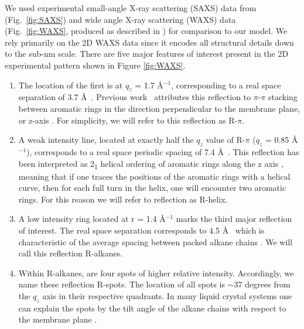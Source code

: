 \documentclass{article}
\newcommand{\angstrom}{\textup{\AA}}
\begin{document}
 
  We used experimental small-angle X-ray scattering (SAXS) data from
  \cite{feng_thin_2016} (Fig.~\ref{fig:SAXS}) and wide angle X-ray scattering
  (WAXS) data (Fig.~\ref{fig:WAXS}, produced as described in
  \cite{feng_scalable_2014}) for comparison to our model. We rely primarily on the 2D WAXS data
  since it encodes all structural details down to the sub-nm scale.  There are
  five major features of interest present in the 2D experimental pattern shown in
  Figure \ref{fig:WAXS}.

  \begin{enumerate} 
  
	\item The location of the first is at $q_z$ = 1.7 \angstrom$^{-1}$,
	corresponding to a real space separation of 3.7 \angstrom~. Previous
	work~\cite{feng_scalable_2014} attributes this reflection to $\pi$-$\pi$
	stacking between aromatic rings in the direction perpendicular to the membrane
	plane, or z-axis \cite{feng_scalable_2014}. For simplicity, we will refer to
	this reflection as R-$\pi$.
 
	\item A weak intensity line, located at exactly half the $q_z$ value of
	R-$\pi$ ($q_z$ = 0.85 \angstrom$^{-1}$), corresponds to a real space periodic
	spacing of 7.4 \angstrom~. This reflection has been interpreted as
	2\textsubscript{1} helical ordering of aromatic rings along the z axis
	\cite{feng_scalable_2014}, meaning that if one traces the positions of the
	aromatic rings with a helical curve, then for each full turn in the helix, one
	will encounter two aromatic rings. For this reason we will refer to reflection
	as R-helix. 

	\item A low intensity ring located at r = 1.4 \angstrom$^{-1}$ marks
	the third major reflection of interest. The real space separation corresponds
	to 4.5 \angstrom~ which is characteristic of the average spacing between packed
	alkane chains \cite{mcintosh_organization_1980}. We will call this reflection
	R-alkanes.

	\item Within R-alkanes, are four spots of higher relative intensity.
	Accordingly, we name these reflection R-spots. The location of all spots is $\sim 37$
	degrees from the $q_z$ axis in their respective quadrants. In many liquid
	crystal systems one can explain the spots by the tilt angle of the alkane chains
	with respect to the membrane plane \cite{govind_simple_2001}.
 

\end{enumerate}
\end{document}
